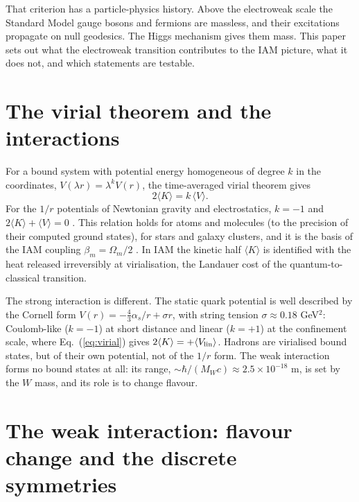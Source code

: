 \documentclass[12pt,a4paper]{article}
\begin{document}
That criterion has a particle-physics history. Above the electroweak scale the
Standard Model gauge bosons and fermions are massless, and their excitations
propagate on null geodesics. The Higgs mechanism gives them mass. This paper sets
out what the electroweak transition contributes to the IAM picture, what it does
not, and which statements are testable.

\section{The virial theorem and the interactions}
\label{sec:virial}

For a bound system with potential energy homogeneous of degree $k$ in the
coordinates, $V(\lambda r)=\lambda^k V(r)$, the time-averaged virial theorem gives
\begin{equation}
  2\langle K\rangle = k\,\langle V\rangle .
  \label{eq:virial}
\end{equation}
For the $1/r$ potentials of Newtonian gravity and electrostatics, $k=-1$ and
$2\langle K\rangle+\langle V\rangle=0$ \citep{clausius1870}. This relation holds for
atoms and molecules (to the precision of their computed ground states), for stars
and galaxy clusters, and it is the basis of the IAM coupling $\beta_m=\Omega_m/2$
\citep{mahaffey2026_thermo_virial}. In IAM the kinetic half $\langle K\rangle$ is
identified with the heat released irreversibly at virialisation, the Landauer cost
of the quantum-to-classical transition.

The strong interaction is different. The static quark potential is well described
by the Cornell form $V(r)=-\tfrac{4}{3}\alpha_s/r+\sigma r$, with string tension
$\sigma\approx0.18$ GeV$^2$: Coulomb-like ($k=-1$) at short distance and linear
($k=+1$) at the confinement scale, where Eq.~(\ref{eq:virial}) gives
$2\langle K\rangle=+\langle V_{\rm lin}\rangle$. Hadrons are virialised bound states,
but of their own potential, not of the $1/r$ form. The weak interaction forms no
bound states at all: its range, $\sim\hbar/(M_W c)\approx2.5\times10^{-18}$ m, is
set by the $W$ mass, and its role is to change flavour.

\section{The weak interaction: flavour change and the discrete symmetries}
\label{sec:weak}
\end{document}
